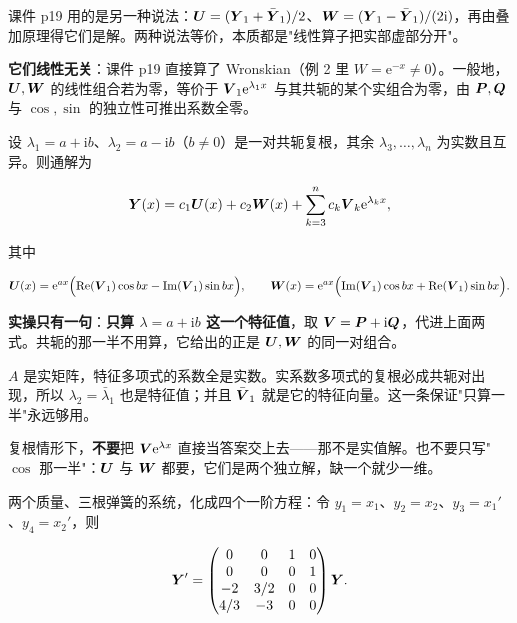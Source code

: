 \documentclass[11pt]{ctexart}
\begin{document}
课件 p19 用的是另一种说法：$\boldsymbol{U}=(\boldsymbol{Y}_1+\bar{\boldsymbol{Y}}_1)/2$、$\boldsymbol{W}=(\boldsymbol{Y}_1-\bar{\boldsymbol{Y}}_1)/(2\mathrm{i})$，再由叠加原理得它们是解。两种说法等价，本质都是"线性算子把实部虚部分开"。

\textbf{它们线性无关}：课件 p19 直接算了 Wronskian（例 2 里 $W=\mathrm{e}^{-x}\neq0$）。一般地，$\boldsymbol{U},\boldsymbol{W}$ 的线性组合若为零，等价于 $\boldsymbol{V}_1\mathrm{e}^{\lambda_1x}$ 与其共轭的某个实组合为零，由 $\boldsymbol{P},\boldsymbol{Q}$ 与 $\cos,\sin$ 的独立性可推出系数全零。


设 $\lambda_1=a+\mathrm{i}b$、$\lambda_2=a-\mathrm{i}b$（$b\neq0$）是一对共轭复根，其余 $\lambda_3,\dots,\lambda_n$ 为实数且互异。则通解为

\[
\boldsymbol{Y}(x)=c_1\boldsymbol{U}(x)+c_2\boldsymbol{W}(x)+\sum_{k=3}^{n}c_k\boldsymbol{V}_k\mathrm{e}^{\lambda_k x},
\]

其中

\[
\boldsymbol{U}(x)=\mathrm{e}^{ax}\Bigl(\operatorname{Re}(\boldsymbol{V}_1)\cos bx-\operatorname{Im}(\boldsymbol{V}_1)\sin bx\Bigr),
\qquad
\boldsymbol{W}(x)=\mathrm{e}^{ax}\Bigl(\operatorname{Im}(\boldsymbol{V}_1)\cos bx+\operatorname{Re}(\boldsymbol{V}_1)\sin bx\Bigr).
\]

\textbf{实操只有一句}：\textbf{只算 $\lambda=a+\mathrm{i}b$ 这一个特征值}，取 $\boldsymbol{V}=\boldsymbol{P}+\mathrm{i}\boldsymbol{Q}$，代进上面两式。共轭的那一半不用算，它给出的正是 $\boldsymbol{U},\boldsymbol{W}$ 的同一对组合。


$A$ 是实矩阵，特征多项式的系数全是实数。实系数多项式的复根必成共轭对出现，所以 $\lambda_2=\bar\lambda_1$ 也是特征值；并且 $\bar{\boldsymbol{V}}_1$ 就是它的特征向量。这一条保证"只算一半"永远够用。


复根情形下，\textbf{不要}把 $\boldsymbol{V}\mathrm{e}^{\lambda x}$ 直接当答案交上去——那不是实值解。也不要只写"$\cos$ 那一半"：$\boldsymbol{U}$ 与 $\boldsymbol{W}$ 都要，它们是两个独立解，缺一个就少一维。



两个质量、三根弹簧的系统，化成四个一阶方程：令 $y_1=x_1$、$y_2=x_2$、$y_3=x_1'$、$y_4=x_2'$，则

\[
\boldsymbol{Y}'=\begin{pmatrix}
0&0&1&0\\
0&0&0&1\\
-2&3/2&0&0\\
4/3&-3&0&0
\end{pmatrix}\boldsymbol{Y}.
\]
\end{document}
